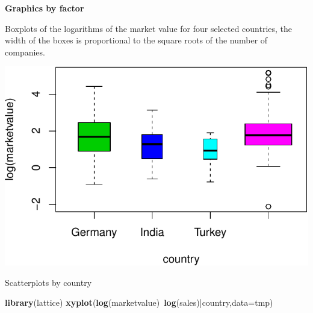 \documentclass[]{article}
\newenvironment{Shaded}{\begin{snugshade}}{\end{snugshade}}
\newcommand{\KeywordTok}[1]{\textcolor[rgb]{0.13,0.29,0.53}{\textbf{{#1}}}}
\newcommand{\DataTypeTok}[1]{\textcolor[rgb]{0.13,0.29,0.53}{{#1}}}
\newcommand{\DecValTok}[1]{\textcolor[rgb]{0.00,0.00,0.81}{{#1}}}
\newcommand{\StringTok}[1]{\textcolor[rgb]{0.31,0.60,0.02}{{#1}}}
\newcommand{\OtherTok}[1]{\textcolor[rgb]{0.56,0.35,0.01}{{#1}}}
\newcommand{\NormalTok}[1]{{#1}}
\numberwithin{equation}{section}
\begin{document}
\textbf{Graphics by factor}

Boxplots of the logarithms of the market value for four selected
countries, the width of the boxes is proportional to the square roots of
the number of companies.

\begin{Shaded}
\end{Shaded}

\includegraphics{tema1_files/figure-latex/unnamed-chunk-154-1.pdf}

Scatterplots by country

\begin{Shaded}
\begin{Highlighting}[]
\KeywordTok{library}\NormalTok{(lattice)}
\KeywordTok{xyplot}\NormalTok{(}\KeywordTok{log}\NormalTok{(marketvalue)~}\KeywordTok{log}\NormalTok{(sales)|country,}\DataTypeTok{data=}\NormalTok{tmp)}
\end{Highlighting}
\end{Shaded}
\end{document}
